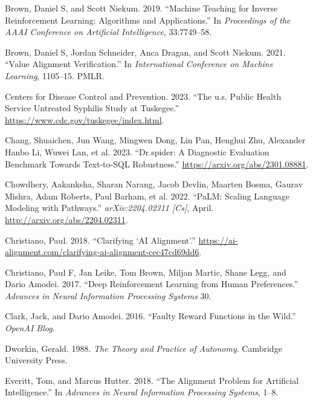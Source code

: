 \documentclass[
  letterpaper,
  DIV=11,
  numbers=noendperiod,
  oneside]{scrreprt}
\newlength{\cslhangindent}
\newenvironment{CSLReferences}[2] %
 {\begin{list}{}{%
  \setlength{\itemindent}{0pt}
  \setlength{\leftmargin}{0pt}
  \setlength{\parsep}{0pt}
  \ifodd #1
   \setlength{\leftmargin}{\cslhangindent}
   \setlength{\itemindent}{-1\cslhangindent}
  \fi
  \setlength{\itemsep}{#2\baselineskip}}}
 {\end{list}}
\theoremstyle{remark}
\begin{document}
\begin{CSLReferences}{1}{0}
Brown, Daniel S, and Scott Niekum. 2019. {``Machine Teaching for Inverse
Reinforcement Learning: Algorithms and Applications.''} In
\emph{Proceedings of the AAAI Conference on Artificial Intelligence},
33:7749--58.

Brown, Daniel S, Jordan Schneider, Anca Dragan, and Scott Niekum. 2021.
{``Value Alignment Verification.''} In \emph{International Conference on
Machine Learning}, 1105--15. PMLR.

Centers for Disease Control and Prevention. 2023. {``The u.s. Public
Health Service Untreated Syphilis Study at Tuskegee.''}
\url{https://www.cdc.gov/tuskegee/index.html}.

Chang, Shuaichen, Jun Wang, Mingwen Dong, Lin Pan, Henghui Zhu,
Alexander Hanbo Li, Wuwei Lan, et al. 2023. {``Dr.spider: A Diagnostic
Evaluation Benchmark Towards Text-to-SQL Robustness.''}
\url{https://arxiv.org/abs/2301.08881}.

Chowdhery, Aakanksha, Sharan Narang, Jacob Devlin, Maarten Bosma, Gaurav
Mishra, Adam Roberts, Paul Barham, et al. 2022. {``{PaLM}: {Scaling}
{Language} {Modeling} with {Pathways}.''} \emph{arXiv:2204.02311
{[}Cs{]}}, April. \url{http://arxiv.org/abs/2204.02311}.

Christiano, Paul. 2018. {``Clarifying {`AI Alignment'}.''}
\url{https://ai-alignment.com/clarifying-ai-alignment-cec47cd69dd6}.

Christiano, Paul F, Jan Leike, Tom Brown, Miljan Martic, Shane Legg, and
Dario Amodei. 2017. {``Deep Reinforcement Learning from Human
Preferences.''} \emph{Advances in Neural Information Processing Systems}
30.

Clark, Jack, and Dario Amodei. 2016. {``Faulty Reward Functions in the
Wild.''} \emph{OpenAI Blog}.

Dworkin, Gerald. 1988. \emph{The Theory and Practice of Autonomy}.
Cambridge University Press.

Everitt, Tom, and Marcus Hutter. 2018. {``The Alignment Problem for
Artificial Intelligence.''} In \emph{Advances in Neural Information
Processing Systems}, 1--8.


\end{CSLReferences}
\end{document}
